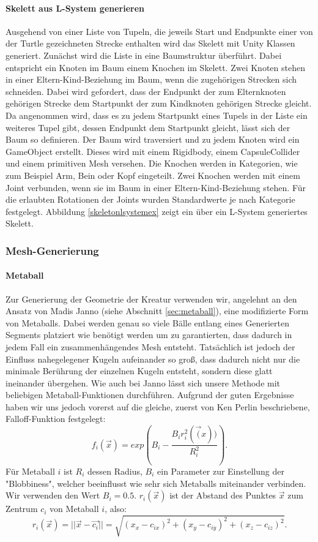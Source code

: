 \paragraph*{Skelett aus L-System generieren}\label{sec:lsystemskel}
Ausgehend von einer Liste von Tupeln, die jeweils Start und Endpunkte einer von der Turtle gezeichneten Strecke enthalten wird das Skelett mit Unity Klassen generiert. Zunächst wird die Liste in eine Baumstruktur überführt. Dabei entspricht ein Knoten im Baum einem Knochen im Skelett. Zwei Knoten stehen in einer Eltern-Kind-Beziehung im Baum, wenn die zugehörigen Strecken sich schneiden. Dabei wird gefordert, dass der Endpunkt der zum Elternknoten gehörigen Strecke dem Startpunkt der zum Kindknoten gehörigen Strecke gleicht. Da angenommen wird, dass es zu jedem Startpunkt eines Tupels in der Liste ein weiteres Tupel gibt, dessen Endpunkt dem Startpunkt gleicht, lässt sich der Baum so definieren. Der Baum wird traversiert und zu jedem Knoten wird ein GameObject erstellt.  Dieses wird mit einem Rigidbody, einem CapsuleCollider und einem primitiven Mesh versehen. Die Knochen werden in Kategorien, wie zum Beispiel Arm, Bein oder Kopf eingeteilt. Zwei Knochen werden mit einem Joint verbunden, wenn sie im Baum in einer Eltern-Kind-Beziehung stehen. Für die erlaubten Rotationen der Joints wurden Standardwerte je nach Kategorie festgelegt. Abbildung \ref{skeletonlsystemex} zeigt ein über ein L-System generiertes Skelett.



\subsubsection{Mesh-Generierung}
\paragraph{Metaball}\label{Metaball_Gen}
Zur Generierung der Geometrie der Kreatur verwenden wir, angelehnt an den Ansatz von Madis Janno \cite{Janno20182dCG} (siehe Abschnitt \ref{sec:metaball}), eine modifizierte Form von Metaballs. Dabei werden genau so viele Bälle entlang eines Generierten Segments platziert wie benötigt werden um zu garantierten, dass dadurch in jedem Fall ein zusammenhängendes Mesh entsteht. Tatsächlich ist jedoch der Einfluss nahegelegener Kugeln aufeinander so groß, dass dadurch nicht nur die minimale Berührung der einzelnen Kugeln entsteht, sondern diese glatt ineinander übergehen. Wie auch bei Janno lässt sich unsere Methode mit beliebigen Metaball-Funktionen durchführen. Aufgrund der guten Ergebnisse haben wir uns jedoch vorerst auf die gleiche, zuerst von Ken Perlin beschriebene, Falloff-Funktion festgelegt:
\[f_i(\vec{x}) = exp(B_i - \frac{B_ir_i^2(\vec(x))}{R_i^2}).\]
Für Metaball $i$ ist $R_i$ dessen Radius, $B_i$ ein Parameter zur Einstellung der "Blobbiness", welcher beeinflusst wie sehr sich Metaballs miteinander verbinden. Wir verwenden den Wert $B_i = 0.5$. $r_i(\vec{x})$ ist der Abstand des Punktes $\vec{x}$ zum Zentrum $c_i$ von Metaball $i$, also: \[r_i(\vec{x})=||\vec{x}-\vec{c_i}||=\sqrt{(x_x-c_{ix})^2+(x_y-c_{iy})^2+(x_z-c_{iz})^2}.\]

